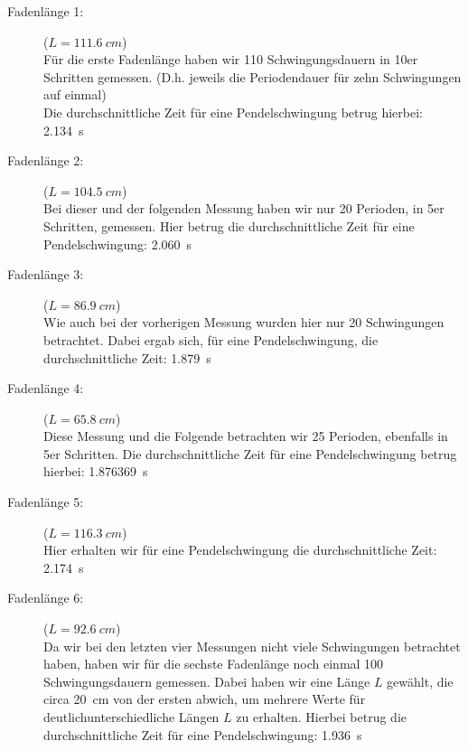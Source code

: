 \documentclass[11pt,a4paper,titlepage, ngerman]{article}
\begin{document}
			\begin{description}
				
				\item[Fadenlänge 1:]($L = \SI{111,6}{cm}$)\\
				Für die erste Fadenlänge haben wir 110 Schwingungsdauern in 10er Schritten gemessen. (D.h. jeweils die Periodendauer für zehn Schwingungen auf einmal) \\
				Die durchschnittliche Zeit für eine Pendelschwingung betrug hierbei: \SI{2.134}{s}
				
				\item[Fadenlänge 2:]($L = \SI{104,5}{cm}$)\\ 				 
				Bei dieser und der folgenden Messung haben wir nur 20 Perioden, in 5er Schritten, gemessen. Hier betrug die durchschnittliche Zeit für eine Pendelschwingung: \SI{2,060}{s}
				
				\item[Fadenlänge 3:]($L = \SI{86,9}{cm}$)\\ 			
				Wie auch bei der vorherigen Messung wurden hier nur 20 Schwingungen betrachtet. Dabei ergab sich, für eine Pendelschwingung, die durchschnittliche Zeit: \SI{1,879}{s}		
				
				\item[Fadenlänge 4:]($L = \SI{65,8}{cm}$)\\ 				
				Diese Messung und die Folgende betrachten wir 25 Perioden, ebenfalls in 5er Schritten. Die durchschnittliche Zeit für eine Pendelschwingung betrug hierbei: \SI{1,876369}{s}
				
				\item[Fadenlänge 5:]($L = \SI{116,3}{cm}$)\\ 				
				Hier erhalten wir für eine Pendelschwingung die durchschnittliche Zeit: \SI{2,174}{s}
				
				\item[Fadenlänge 6:]($L = \SI{92,6}{cm}$)\\ 				
				Da wir bei den letzten vier Messungen nicht viele Schwingungen betrachtet haben, haben wir für die sechste Fadenlänge noch einmal 100 Schwingungsdauern gemessen. Dabei haben wir eine Länge $L$ gewählt, die circa \SI{20}{cm} von der ersten abwich, um mehrere Werte für \glqq deutlich\grqq unterschiedliche Längen $L$ zu erhalten. 
				Hierbei betrug die durchschnittliche Zeit für eine Pendelschwingung: \SI{1,936}{s}
				
			\end{description}
		
\end{document}

